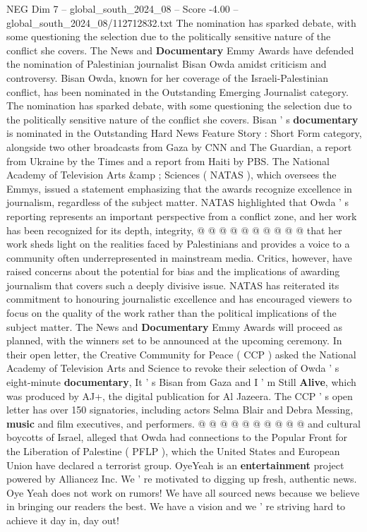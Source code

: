 \begin{textsample}{NEG Dim 7 – global\_south\_2024\_08 – Score -4.00 – global\_south\_2024\_08/112712832.txt}  \label{ex:f7_neg_379}
The nomination has sparked debate, with some questioning the selection due to the politically sensitive nature of the conflict she covers.
The News and \textbf{Documentary} Emmy Awards have defended the nomination of Palestinian journalist Bisan Owda amidst criticism and controversy.
Bisan Owda, known for her coverage of the Israeli-Palestinian conflict, has been nominated in the Outstanding Emerging Journalist category.
The nomination has sparked debate, with some questioning the selection due to the politically sensitive nature of the conflict she covers.
Bisan ' s \textbf{documentary} is nominated in the Outstanding Hard News Feature Story : Short Form category, alongside two other broadcasts from Gaza by CNN and The Guardian, a report from Ukraine by the Times and a report from Haiti by PBS.
The National Academy of Television Arts \&amp ; Sciences ( NATAS ), which oversees the Emmys, issued a statement emphasizing that the awards recognize excellence in journalism, regardless of the subject matter.
NATAS highlighted that Owda ' s reporting represents an important perspective from a conflict zone, and her work has been recognized for its depth, integrity, @ @ @ @ @ @ @ @ @ @ that her work sheds light on the realities faced by Palestinians and provides a voice to a community often underrepresented in mainstream media.
Critics, however, have raised concerns about the potential for bias and the implications of awarding journalism that covers such a deeply divisive issue.
NATAS has reiterated its commitment to honouring journalistic excellence and has encouraged viewers to focus on the quality of the work rather than the political implications of the subject matter.
The News and \textbf{Documentary} Emmy Awards will proceed as planned, with the winners set to be announced at the upcoming ceremony.
In their open letter, the Creative Community for Peace ( CCP ) asked the National Academy of Television Arts and Science to revoke their selection of Owda ' s eight-minute \textbf{documentary}, It ' s Bisan from Gaza and I ' m Still \textbf{Alive}, which was produced by AJ+, the digital publication for Al Jazeera.
The CCP ' s open letter has over 150 signatories, including actors Selma Blair and Debra Messing, \textbf{music} and film executives, and performers. @ @ @ @ @ @ @ @ @ @ and cultural boycotts of Israel, alleged that Owda had connections to the Popular Front for the Liberation of Palestine ( PFLP ), which the United States and European Union have declared a terrorist group.
OyeYeah is an \textbf{entertainment} project powered by Alliancez Inc.
We ' re motivated to digging up fresh, authentic news.
Oye Yeah does not work on rumors!
We have all sourced news because we believe in bringing our readers the best.
We have a vision and we ' re striving hard to achieve it day in, day out!

\end{textsample}
